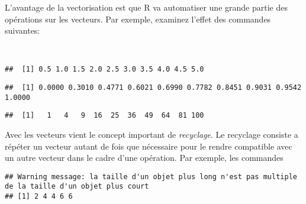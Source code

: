 L'avantage de la vectorisation est que R va automatiser une grande partie des opérations sur les vecteurs.
Par exemple, examinez l'effet des commandes suivantes:

\begin{knitrout}
\color{fgcolor}\begin{kframe}
\begin{flushleft}
\ttfamily\noindent
{}\hlassignement{=}{\ }\hlkeyword{(}\hlkeyword{:}\hlkeyword{)}\hspace*{\fill}\\
\hlstd{}\hlkeyword{/}\mbox{}
\normalfont
\end{flushleft}
\begin{verbatim}
##  [1] 0.5 1.0 1.5 2.0 2.5 3.0 3.5 4.0 4.5 5.0
\end{verbatim}
\begin{flushleft}
\ttfamily\noindent
{}\hlkeyword{(}\hlkeyword{,}{\ }\hlkeyword{)}\mbox{}
\normalfont
\end{flushleft}
\begin{verbatim}
##  [1] 0.0000 0.3010 0.4771 0.6021 0.6990 0.7782 0.8451 0.9031 0.9542 1.0000
\end{verbatim}
\begin{flushleft}
\ttfamily\noindent
{}\hlkeyword{*}{\ }\mbox{}
\normalfont
\end{flushleft}
\begin{verbatim}
##  [1]   1   4   9  16  25  36  49  64  81 100
\end{verbatim}
\end{kframe}
\end{knitrout}


Avec les vecteurs vient le concept important de \emph{recyclage}.
Le recyclage consiste a répéter un vecteur autant de fois que nécessaire pour le rendre compatible avec un autre vecteur dans le cadre d'une opération.
Par exemple, les commandes

\begin{knitrout}
\color{fgcolor}\begin{kframe}
\begin{flushleft}
\ttfamily\noindent
{}\hlkeyword{(}\hlkeyword{,}{\ }\hlkeyword{,}{\ }\hlkeyword{,}{\ }\hlkeyword{,}{\ }\hlkeyword{)}{\ }\hlkeyword{+}{\ }\hlkeyword{(}\hlkeyword{,}{\ }\hlkeyword{)}\mbox{}
\normalfont
\end{flushleft}
\begin{verbatim}
## Warning message: la taille d'un objet plus long n'est pas multiple de la taille d'un objet plus court
## [1] 2 4 4 6 6
\end{verbatim}
\end{kframe}
\end{knitrout}



